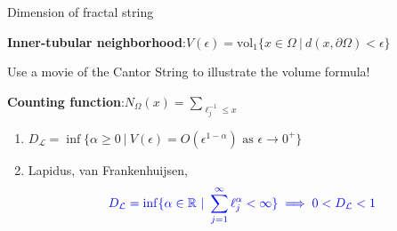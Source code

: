 \documentclass{if-beamer}
\begin{document}
\begin{frame}{Dimension of fractal string}

{\bf Inner-tubular neighborhood}:\quad $V(\epsilon) = \text{vol}_1\{x \in \Omega\ |\ d(x,\partial\Omega) < \epsilon\}$

\pause
\vspace{.2 in}

{\color{red} Use a movie of the Cantor String to illustrate the volume formula!}

\pause
\vspace{.2 in}

{\bf Counting function}:\quad $N_{\Omega}(x) = \sum_{\ell_j^{-1} \leq x}$





\begin{enumerate}
\item[] $D_{\mathcal{L}} = \inf\{\alpha \geq 0\ |\ V(\epsilon) = O(\epsilon^{1 - \alpha})\text{ as }\epsilon \to 0^+\}$ \\

\pause

\item[] Lapidus, van Frankenhuijsen, \cite{lapidus2000fractal, lapidus2003complex, lapidus2012fractal}
\[ {\color{blue} D_\mathcal{L} = \inf\{\alpha \in \mathbb{R}\ |\ \sum_{j = 1}^\infty \ell_j^{\alpha} < \infty\} \implies 0 < D_{\mathcal{L}} < 1} \]
\end{enumerate}


\end{frame}
\end{document}
